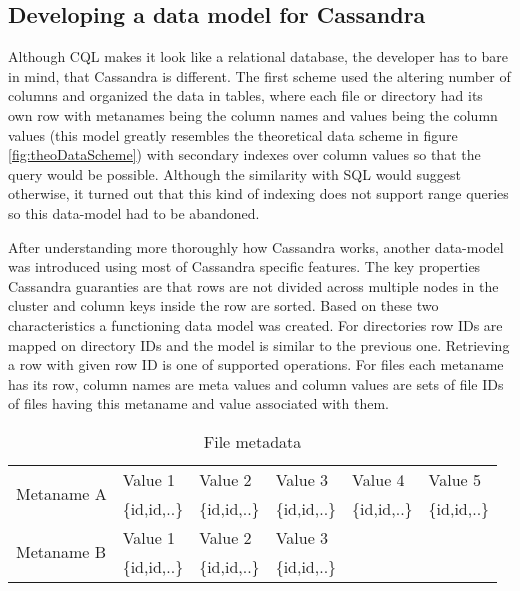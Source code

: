 \subsection{Developing a data model for Cassandra}

Although CQL makes it look like a relational database, the developer has to bare in mind, that
Cassandra is different. The first scheme used the altering number of columns and organized the 
data in tables, where each file or directory had its own row with metanames being the column
names and values being the column values (this model greatly resembles the theoretical data 
scheme in figure \ref{fig:theoDataScheme}) with secondary indexes over column values so that 
the query would be possible. Although the similarity with SQL would suggest otherwise, 
it turned out that this kind of indexing does not support range queries so this data-model
had to be abandoned. 

After understanding more thoroughly how Cassandra works, another data-model was introduced 
using most of Cassandra specific features. The key properties Cassandra guaranties are that 
rows are not divided across multiple nodes in the cluster and column keys inside the row
are sorted. Based on these two characteristics a functioning data model was created. For  
directories row IDs are mapped on directory IDs and the model is similar to the previous one. 
Retrieving a row with given row ID is one of supported operations.
For files each metaname has its row, column names are meta values and column values are sets of 
file IDs of files having this metaname and value associated with them. 

\begin{table}[h]
\centering
\label{tab:fileMeta}
\begin{tabular}{|l|l|l|l|ll}
\hline
\multirow{2}{*}{Metaname A} & Value 1      & Value 2      & Value 3      & \multicolumn{1}{l|}{Value 4}      & \multicolumn{1}{l|}{Value 5}      \\ \cline{2-6}
                            & \{id,id,..\} & \{id,id,..\} & \{id,id,..\} & \multicolumn{1}{l|}{\{id,id,..\}} & \multicolumn{1}{l|}{\{id,id,..\}} \\ \hline
\multirow{2}{*}{Metaname B} & Value 1      & Value 2      & Value 3      &                                   &                                   \\ \cline{2-4}
                            & \{id,id,..\} & \{id,id,..\} & \{id,id,..\} &                                   &                                   \\ \cline{1-4}
\end{tabular}
\caption{File metadata}
\end{table}

